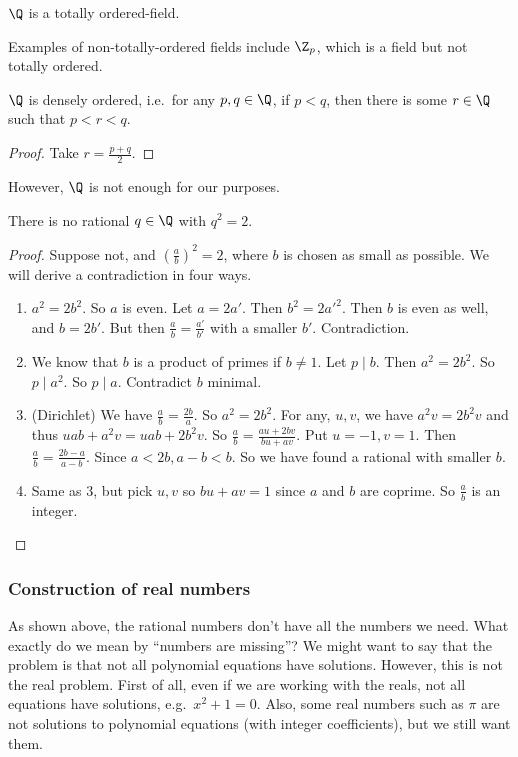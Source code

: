 \documentclass[a4paper]{article}
\begin{document}
\begin{prop}
  $\Q$ is a totally ordered-field.
\end{prop}

Examples of non-totally-ordered fields include $\Z_p$, which is a field but not totally ordered.
\begin{prop}
  $\Q$ is densely ordered, i.e.\ for any $p, q \in \Q$, if $p < q$, then there is some $r \in \Q$ such that $p < r < q$.
\end{prop}
\begin{proof}
  Take $r = \frac{p + q}{2}$.
\end{proof}

However, $\Q$ is not enough for our purposes.
\begin{prop}
  There is no rational $q\in \Q$ with $q^2 = 2$.
\end{prop}

\begin{proof}
  Suppose not, and $(\frac{a}{b})^2 = 2$, where $b$ is chosen as small as possible. We will derive a contradiction in four ways.
  \begin{enumerate}
    \item $a^2 = 2b^2$. So $a$ is even. Let $a = 2a'$. Then $b^2 = 2a'^2$. Then $b$ is even as well, and $b = 2b'$. But then $\frac{a}{b} = \frac{a'}{b'}$ with a smaller $b'$. Contradiction.
    \item We know that $b$ is a product of primes if $b \not= 1$. Let $p \mid b$. Then $a^2 = 2b^2$. So $p \mid a^2$. So $p \mid a$. Contradict $b$ minimal.
    \item (Dirichlet) We have $\frac{a}{b} = \frac{2b}{a}$. So $a^2 = 2b^2$. For any, $u, v$, we have $a^2v = 2b^2v$ and thus $uab + a^2v = uab + 2b^2v$. So $\frac{a}{b} = \frac{au + 2bv}{bu + av}$. Put $u = -1, v = 1$. Then $\frac{a}{b} = \frac{2b - a}{a - b}$. Since $a < 2b, a - b < b$. So we have found a rational with smaller $b$.
    \item Same as 3, but pick $u, v$ so $bu + av = 1$ since $a$ and $b$ are coprime. So $\frac{a}{b}$ is an integer.
  \end{enumerate}
\end{proof}

\subsubsection*{Construction of real numbers}
As shown above, the rational numbers don't have all the numbers we need. What exactly do we mean by ``numbers are missing''? We might want to say that the problem is that not all polynomial equations have solutions. However, this is not the real problem. First of all, even if we are working with the reals, not all equations have solutions, e.g.\ $x^2 + 1 = 0$. Also, some real numbers such as $\pi$ are not solutions to polynomial equations (with integer coefficients), but we still want them.
\end{document}
